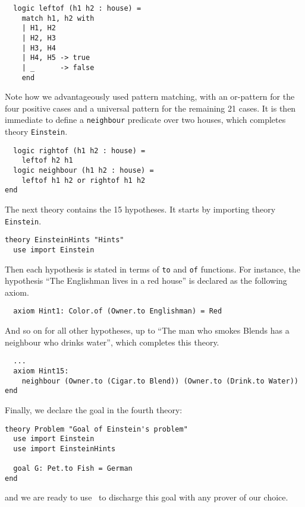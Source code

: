 \begin{verbatim}
  logic leftof (h1 h2 : house) =
    match h1, h2 with
    | H1, H2
    | H2, H3
    | H3, H4
    | H4, H5 -> true
    | _      -> false
    end
\end{verbatim}
Note how we advantageously used pattern matching, with an or-pattern
for the four positive cases and a universal pattern for the remaining
21 cases. It is then immediate to define a \texttt{neighbour}
predicate over two houses, which completes theory \texttt{Einstein}.
\begin{verbatim}
  logic rightof (h1 h2 : house) =
    leftof h2 h1
  logic neighbour (h1 h2 : house) =
    leftof h1 h2 or rightof h1 h2
end
\end{verbatim}

The next theory contains the 15 hypotheses. It starts by importing
theory \texttt{Einstein}.
\begin{verbatim}
theory EinsteinHints "Hints"
  use import Einstein
\end{verbatim}
Then each hypothesis is stated in terms of \texttt{to} and \texttt{of}
functions. For instance, the hypothesis ``The Englishman lives in a
red house'' is declared as the following axiom.
\begin{verbatim}
  axiom Hint1: Color.of (Owner.to Englishman) = Red
\end{verbatim}
And so on for all other hypotheses, up to
``The man who smokes Blends has a neighbour who drinks water'', which completes
this theory.
\begin{verbatim}
  ...
  axiom Hint15:
    neighbour (Owner.to (Cigar.to Blend)) (Owner.to (Drink.to Water))
end
\end{verbatim}
Finally, we declare the goal in the fourth theory:
\begin{verbatim}
theory Problem "Goal of Einstein's problem"
  use import Einstein
  use import EinsteinHints

  goal G: Pet.to Fish = German
end
\end{verbatim}
and we are ready to use \why\ to discharge this goal with any prover
of our choice.

